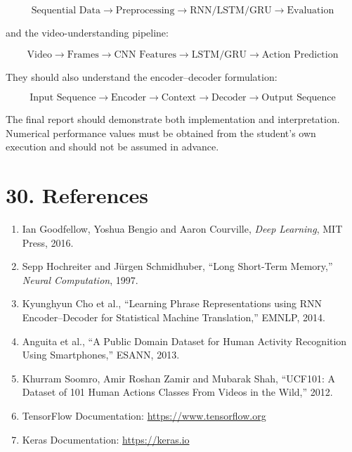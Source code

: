 \documentclass[10pt]{article}
\begin{document}
\[
\boxed{
\text{Sequential Data}
\rightarrow
\text{Preprocessing}
\rightarrow
\text{RNN/LSTM/GRU}
\rightarrow
\text{Evaluation}
}
\]

and the video-understanding pipeline:

\[
\boxed{
\text{Video}
\rightarrow
\text{Frames}
\rightarrow
\text{CNN Features}
\rightarrow
\text{LSTM/GRU}
\rightarrow
\text{Action Prediction}
}
\]

They should also understand the encoder--decoder formulation:

\[
\boxed{
\text{Input Sequence}
\rightarrow
\text{Encoder}
\rightarrow
\text{Context}
\rightarrow
\text{Decoder}
\rightarrow
\text{Output Sequence}
}
\]

The final report should demonstrate both implementation and interpretation.
Numerical performance values must be obtained from the student's own
execution and should not be assumed in advance.

\section*{30. References}

\begin{enumerate}
\item Ian Goodfellow, Yoshua Bengio and Aaron Courville,
\emph{Deep Learning}, MIT Press, 2016.

\item Sepp Hochreiter and Jürgen Schmidhuber,
``Long Short-Term Memory,'' \emph{Neural Computation}, 1997.

\item Kyunghyun Cho et al.,
``Learning Phrase Representations using RNN Encoder--Decoder for Statistical
Machine Translation,'' EMNLP, 2014.

\item Anguita et al.,
``A Public Domain Dataset for Human Activity Recognition Using Smartphones,''
ESANN, 2013.

\item Khurram Soomro, Amir Roshan Zamir and Mubarak Shah,
``UCF101: A Dataset of 101 Human Actions Classes From Videos in the Wild,''
2012.

\item TensorFlow Documentation:
\url{https://www.tensorflow.org}

\item Keras Documentation:
\url{https://keras.io}
\end{enumerate}
\end{document}

